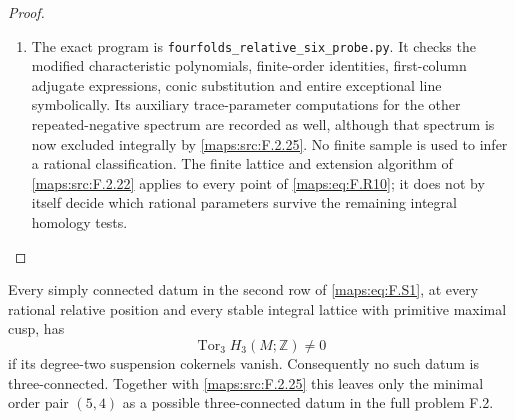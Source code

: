 \begin{proof}
\begin{enumerate}[label=\arabic*.]
\item The exact program is
\texttt{fourfolds\_relative\_six\_probe.py}.
It checks the modified characteristic polynomials, finite-order
identities, first-column adjugate expressions, conic
substitution and entire exceptional line symbolically.
Its auxiliary trace-parameter computations for the other
repeated-negative spectrum are recorded as well, although
that spectrum is now excluded integrally by \ref{maps:src:F.2.25}.
No finite sample is used to infer a rational classification.
The finite lattice and extension algorithm of \ref{maps:src:F.2.22} applies
to every point of \eqref{maps:eq:F.R10}; it does not by itself decide
which rational parameters survive the remaining integral
homology tests.

\end{enumerate}
\end{proof}




\begin{theorem}\label{maps:src:F.2.27}


Every simply connected datum in the second row of \eqref{maps:eq:F.S1},
at every rational relative position and every stable integral
lattice with primitive maximal cusp, has
\[
                 \operatorname{Tor}_3 H_3(M;\mathbb Z)\ne0
\]
if its degree-two suspension cokernels vanish.
Consequently no such datum is three-connected.  Together with
\ref{maps:src:F.2.25} this leaves only the minimal order pair $(5,4)$ as a
possible three-connected datum in the full problem F.2.
\end{theorem}


